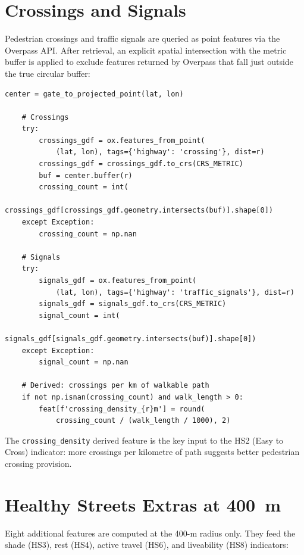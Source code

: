 \documentclass[11pt,a4paper,openany]{book}
\begin{document}
\section{Crossings and Signals}

Pedestrian crossings and traffic signals are queried as point features via the Overpass API. After retrieval, an explicit spatial intersection with the metric buffer is applied to exclude features returned by Overpass that fall just outside the true circular buffer:

\begin{lstlisting}[style=python, caption={Crossing and signal counts per radius.}]
    center = gate_to_projected_point(lat, lon)

    # Crossings
    try:
        crossings_gdf = ox.features_from_point(
            (lat, lon), tags={'highway': 'crossing'}, dist=r)
        crossings_gdf = crossings_gdf.to_crs(CRS_METRIC)
        buf = center.buffer(r)
        crossing_count = int(
            crossings_gdf[crossings_gdf.geometry.intersects(buf)].shape[0])
    except Exception:
        crossing_count = np.nan

    # Signals
    try:
        signals_gdf = ox.features_from_point(
            (lat, lon), tags={'highway': 'traffic_signals'}, dist=r)
        signals_gdf = signals_gdf.to_crs(CRS_METRIC)
        signal_count = int(
            signals_gdf[signals_gdf.geometry.intersects(buf)].shape[0])
    except Exception:
        signal_count = np.nan

    # Derived: crossings per km of walkable path
    if not np.isnan(crossing_count) and walk_length > 0:
        feat[f'crossing_density_{r}m'] = round(
            crossing_count / (walk_length / 1000), 2)
\end{lstlisting}

The \texttt{crossing\_density} derived feature is the key input to the HS2 (Easy to Cross) indicator: more crossings per kilometre of path suggests better pedestrian crossing provision.

\section{Healthy Streets Extras at 400~m}

Eight additional features are computed at the 400-m radius only. They feed the shade (HS3), rest (HS4), active travel (HS6), and liveability (HS8) indicators:
\end{document}
